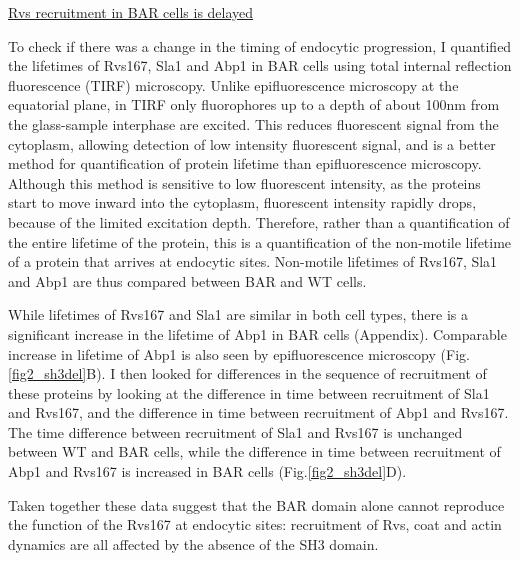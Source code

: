 	\vspace{5mm}
		\underline{Rvs recruitment in BAR cells is delayed}
		
To check if there was a change in the timing of endocytic progression, I quantified the lifetimes of Rvs167, Sla1 and Abp1 in BAR cells using total internal reflection fluorescence (TIRF) microscopy. Unlike epifluorescence microscopy at the equatorial plane, in TIRF only fluorophores up to a depth of about 100nm from the glass-sample interphase are excited. This reduces fluorescent signal from the cytoplasm, allowing detection of low intensity fluorescent signal, and is a better method for quantification of protein lifetime than epifluorescence microscopy. Although this method is sensitive to low fluorescent intensity, as the proteins start to move inward into the cytoplasm, fluorescent intensity rapidly drops, because of the limited excitation depth. Therefore, rather than a quantification of the entire lifetime of the protein, this is a quantification of the non-motile lifetime of a protein that arrives at endocytic sites. Non-motile lifetimes of Rvs167, Sla1 and Abp1 are thus compared between BAR and WT cells. 

\vspace{5mm}
While lifetimes of Rvs167 and Sla1 are similar in both cell types, there is a significant increase in the lifetime of Abp1 in BAR cells (Appendix). Comparable increase in lifetime of Abp1 is also seen by epifluorescence microscopy (Fig.\ref{fig2_sh3del}B). I then looked for differences in the sequence of recruitment of these proteins by looking at the difference in time between recruitment of Sla1 and Rvs167, and the difference in time between recruitment of Abp1 and Rvs167. The time difference between recruitment of Sla1 and Rvs167 is unchanged between WT and BAR cells, while the difference in time between recruitment of Abp1 and Rvs167 is increased in BAR cells  (Fig.\ref{fig2_sh3del}D).

	\vspace{5mm}
Taken together these data suggest that the BAR domain alone cannot reproduce the function of the Rvs167 at endocytic sites: recruitment of Rvs, coat and actin dynamics are all affected by the absence of the SH3 domain. 


